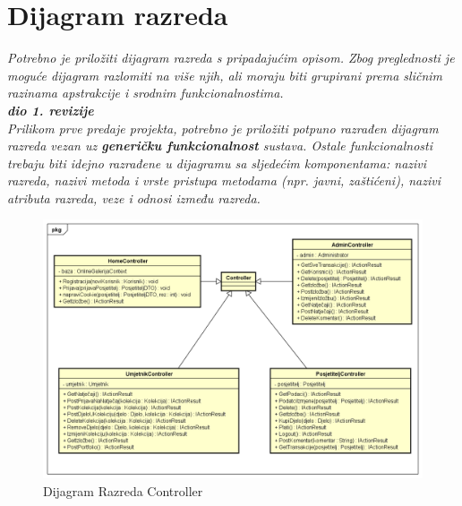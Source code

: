 			\eject
			
			
		\section{Dijagram razreda}
		
			\textit{Potrebno je priložiti dijagram razreda s pripadajućim opisom. Zbog preglednosti je moguće dijagram razlomiti na više njih, ali moraju biti grupirani prema sličnim razinama apstrakcije i srodnim funkcionalnostima.}\\
			
			
			\textbf{\textit{dio 1. revizije}}\\
			
			
			\textit{Prilikom prve predaje projekta, potrebno je priložiti potpuno razrađen dijagram razreda vezan uz \textbf{generičku funkcionalnost} sustava. Ostale funkcionalnosti trebaju biti idejno razrađene u dijagramu sa sljedećim komponentama: nazivi razreda, nazivi metoda i vrste pristupa metodama (npr. javni, zaštićeni), nazivi atributa razreda, veze i odnosi između razreda.}\\
			
			\graphicspath{ {./slike/} }
			\begin{figure}[H]
				
				\includegraphics[width=\textwidth,height=\textheight,keepaspectratio]{Controller Class Diagram}
				\caption{\newline Dijagram Razreda Controller }
				
			\end{figure}
			
